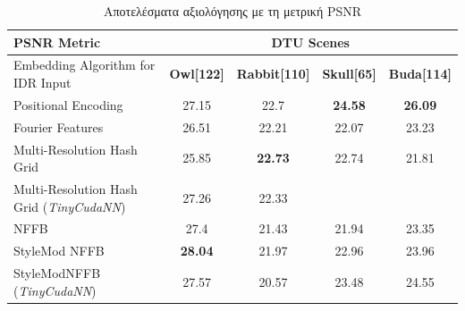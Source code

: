 \begin{table}[H]
\centering
\begin{tabular}{|l|c|c|c|c|}
\hline
\textbf{PSNR Metric} & \multicolumn{4}{c|}{\textbf{DTU Scenes}} \\
\hline
Embedding Algorithm for IDR Input & \textbf{Owl[122]} & \textbf{Rabbit[110]} & \textbf{Skull[65]} & \textbf{Buda[114]} \\
\hline
Positional Encoding & 27.15 & 22.7 & \textbf{24.58} & \textbf{26.09} \\
\hline
Fourier Features & 26.51 & 22.21 & 22.07 & 23.23 \\
\hline
Multi-Resolution Hash Grid & 25.85 & \textbf{22.73} & 22.74 & 21.81 \\
\hline
Multi-Resolution Hash Grid (\textit{TinyCudaNN}) & 27.26 & 22.33 & & \\
\hline
NFFB & 27.4 & 21.43 & 21.94 & 23.35 \\
\hline
StyleMod NFFB & \textbf{28.04} & 21.97 & 22.96 & 23.96 \\
\hline
StyleModNFFB (\textit{TinyCudaNN}) & 27.57 & 20.57 & 23.48 & 24.55 \\
\hline
\end{tabular}
\caption{Αποτελέσματα αξιολόγησης με τη μετρική PSNR}
\end{table}



